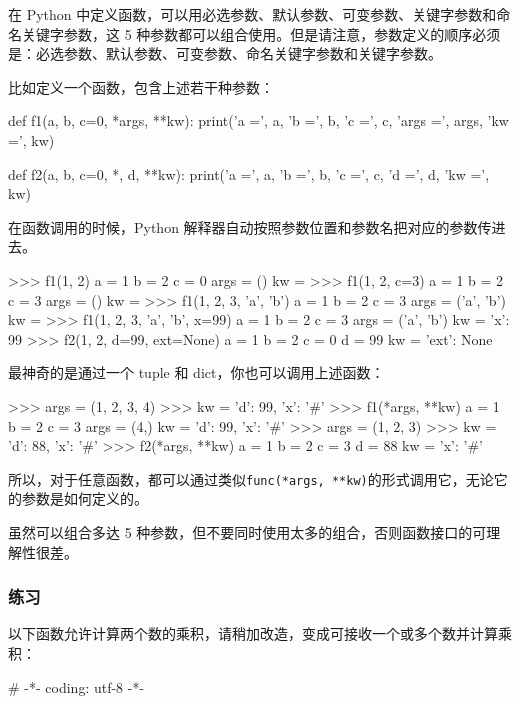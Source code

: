 在 Python
中定义函数，可以用必选参数、默认参数、可变参数、关键字参数和命名关键字参数，这
5
种参数都可以组合使用。但是请注意，参数定义的顺序必须是：必选参数、默认参数、可变参数、命名关键字参数和关键字参数。

比如定义一个函数，包含上述若干种参数：

\begin{pythoncode}
def f1(a, b, c=0, *args, **kw):
    print('a =', a, 'b =', b, 'c =', c, 'args =', args, 'kw =', kw)

def f2(a, b, c=0, *, d, **kw):
    print('a =', a, 'b =', b, 'c =', c, 'd =', d, 'kw =', kw)
\end{pythoncode}

在函数调用的时候，Python
解释器自动按照参数位置和参数名把对应的参数传进去。

\begin{pythoncode}
>>> f1(1, 2)
a = 1 b = 2 c = 0 args = () kw = {}
>>> f1(1, 2, c=3)
a = 1 b = 2 c = 3 args = () kw = {}
>>> f1(1, 2, 3, 'a', 'b')
a = 1 b = 2 c = 3 args = ('a', 'b') kw = {}
>>> f1(1, 2, 3, 'a', 'b', x=99)
a = 1 b = 2 c = 3 args = ('a', 'b') kw = {'x': 99}
>>> f2(1, 2, d=99, ext=None)
a = 1 b = 2 c = 0 d = 99 kw = {'ext': None}
\end{pythoncode}

最神奇的是通过一个 tuple 和 dict，你也可以调用上述函数：

\begin{pythoncode}
>>> args = (1, 2, 3, 4)
>>> kw = {'d': 99, 'x': '#'}
>>> f1(*args, **kw)
a = 1 b = 2 c = 3 args = (4,) kw = {'d': 99, 'x': '#'}
>>> args = (1, 2, 3)
>>> kw = {'d': 88, 'x': '#'}
>>> f2(*args, **kw)
a = 1 b = 2 c = 3 d = 88 kw = {'x': '#'}
\end{pythoncode}

所以，对于任意函数，都可以通过类似\texttt{func(*args,\ **kw)}的形式调用它，无论它的参数是如何定义的。

虽然可以组合多达 5
种参数，但不要同时使用太多的组合，否则函数接口的可理解性很差。

\hypertarget{ux7ec3ux4e60}{%
\subsubsection{练习}\label{ux7ec3ux4e60}}

以下函数允许计算两个数的乘积，请稍加改造，变成可接收一个或多个数并计算乘积：

\begin{pythoncode}
# -*- coding: utf-8 -*-
\end{pythoncode}

